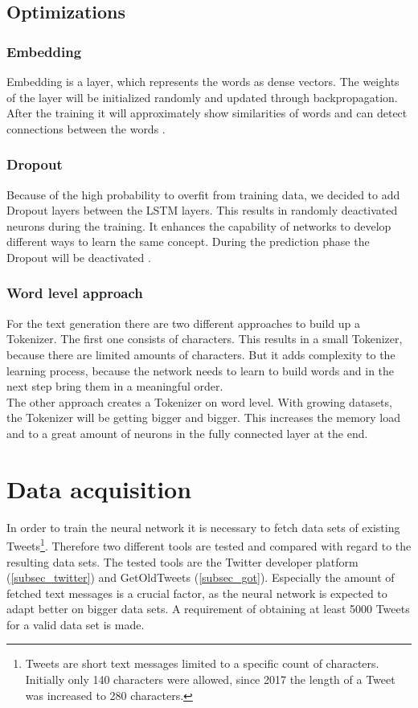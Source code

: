 \documentclass[conference]{IEEEtran}
\begin{document}
\subsection{Optimizations}

\subsubsection{Embedding}

Embedding is a layer, which represents the words as dense vectors. The weights of the layer will be initialized randomly and updated through backpropagation. After the training it will approximately show similarities of words and can detect connections between the words \cite{tim4}.

\subsubsection{Dropout}

Because of the high probability to overfit from training data, we decided to add Dropout layers between the LSTM layers. This results in randomly deactivated neurons during the training. It enhances the capability of networks to develop different ways to learn the same concept. During the prediction phase the Dropout will be deactivated \cite{tim5}.

\subsubsection{Word level approach}

For the text generation there are two different approaches to build up a Tokenizer. The first one consists of characters. This results in a small Tokenizer, because there are limited amounts of characters. But it adds complexity to the learning process, because the network needs to learn to build words and in the next step bring them in a meaningful order.\\
The other approach creates a Tokenizer on word level. With growing datasets, the Tokenizer will be getting bigger and bigger. This increases the memory load and to a great amount of neurons in the fully connected layer at the end.

\section{Data acquisition}

In order to train the neural network it is necessary to fetch data sets of existing Tweets\footnote{Tweets are short text messages limited to a specific count of characters. Initially only 140 characters were allowed, since 2017 the length of a Tweet was increased to 280 characters.}. Therefore two different tools are tested and compared with regard to the resulting data sets. The tested tools are the Twitter developer platform \cite{twidev} (\ref{subsec_twitter}) and GetOldTweets \cite{got} (\ref{subsec_got}). Especially the amount of fetched text messages  is a crucial factor, as the neural network is expected to adapt better on bigger data sets. A requirement of obtaining at least 5000 Tweets for a valid data set is made.\\
\end{document}
